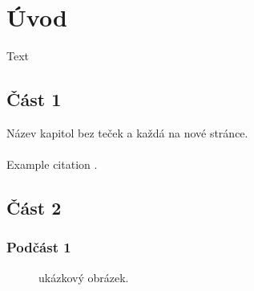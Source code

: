 \documentclass[12pt,a4paper]{article} %
\begin{document}
\newpage

\tableofcontents %

\newpage


\section{Úvod} %

{\color{red} Text}


\subsection{Část 1} %

{\color{red} Název kapitol bez teček a každá na nové stránce.}\\\\
\lipsum[1] %
Example citation \cite{1}.


\subsection{Část 2} %

\lipsum[2] %


\subsubsection{Podčást 1} %

\lipsum[3] %

\begin{figure}[H] %
\caption{ukázkový obrázek.}
\label{fig:speciation}
\end{figure}
\end{document}
